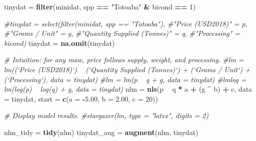 \documentclass[]{article}
\newenvironment{Shaded}{\begin{snugshade}}{\end{snugshade}}
\newcommand{\KeywordTok}[1]{\textcolor[rgb]{0.13,0.29,0.53}{\textbf{#1}}}
\newcommand{\DataTypeTok}[1]{\textcolor[rgb]{0.13,0.29,0.53}{#1}}
\newcommand{\DecValTok}[1]{\textcolor[rgb]{0.00,0.00,0.81}{#1}}
\newcommand{\FloatTok}[1]{\textcolor[rgb]{0.00,0.00,0.81}{#1}}
\newcommand{\StringTok}[1]{\textcolor[rgb]{0.31,0.60,0.02}{#1}}
\newcommand{\CommentTok}[1]{\textcolor[rgb]{0.56,0.35,0.01}{\textit{#1}}}
\newcommand{\OperatorTok}[1]{\textcolor[rgb]{0.81,0.36,0.00}{\textbf{#1}}}
\newcommand{\NormalTok}[1]{#1}
\begin{document}
\begin{Shaded}
\begin{Highlighting}[]
\NormalTok{    tinydat =}\StringTok{ }\KeywordTok{filter}\NormalTok{(minidat, spp }\OperatorTok{==}\StringTok{ "Totoaba"} \OperatorTok{&}\StringTok{ }\NormalTok{bicond }\OperatorTok{==}\StringTok{ }\DecValTok{1}\NormalTok{)}
    
    \CommentTok{#tinydat = select(filter(minidat, spp == "Totoaba"),}
                     \CommentTok{#"Price (USD2018)" = p,}
                     \CommentTok{#"Grams / Unit" = g,}
                     \CommentTok{#"Quantity Supplied (Tonnes)" = q, }
                     \CommentTok{#"Processing" = bicond)}
\NormalTok{    tinydat =}\StringTok{ }\KeywordTok{na.omit}\NormalTok{(tinydat)}

    \CommentTok{# Intuition: for any maw, price follows supply, weight, and processing.}
\CommentTok{#lm = lm((`Price (USD2018)`) ~ (`Quantity Supplied (Tonnes)`) + (`Grams / Unit`) + (`Processing`), data = tinydat)}
\CommentTok{#lm = lm(p ~ q + g, data = tinydat)}
\CommentTok{#lmlog = lm(log(p) ~ log(q) + g, data = tinydat)}
\NormalTok{nlm =}\StringTok{ }\KeywordTok{nls}\NormalTok{(p }\OperatorTok{~}\StringTok{ }\NormalTok{q }\OperatorTok{*}\StringTok{ }\NormalTok{a }\OperatorTok{+}\StringTok{ }\NormalTok{(g }\OperatorTok{^}\StringTok{ }\NormalTok{b) }\OperatorTok{+}\StringTok{ }\NormalTok{c, }\DataTypeTok{data =}\NormalTok{ tinydat, }\DataTypeTok{start =} \KeywordTok{c}\NormalTok{(}\DataTypeTok{a =} \OperatorTok{-}\FloatTok{5.00}\NormalTok{, }\DataTypeTok{b =} \FloatTok{2.00}\NormalTok{, }\DataTypeTok{c =} \DecValTok{20}\NormalTok{))}
\end{Highlighting}
\end{Shaded}

\begin{Shaded}
\begin{Highlighting}[]
\CommentTok{# Display model results.}
\CommentTok{#stargazer(lm, type = "latex", digits = 2)}
\end{Highlighting}
\end{Shaded}

\begin{Shaded}
\begin{Highlighting}[]
\NormalTok{nlm_tidy =}\StringTok{ }\KeywordTok{tidy}\NormalTok{(nlm)}
\NormalTok{tinydat_aug =}\StringTok{ }\KeywordTok{augment}\NormalTok{(nlm, tinydat)}
\end{Highlighting}
\end{Shaded}
\end{document}
